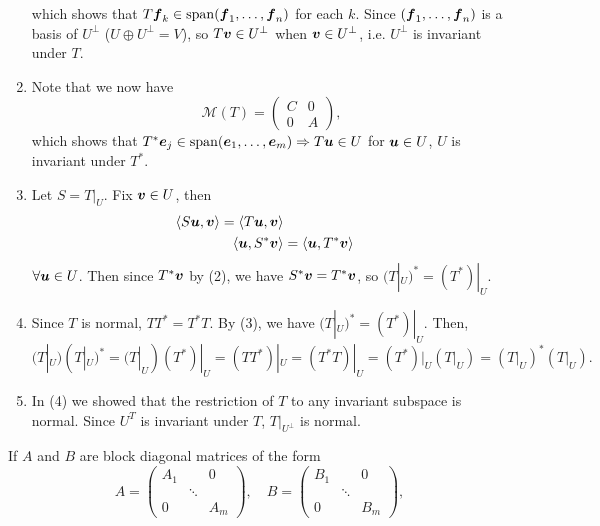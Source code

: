 \documentclass{report}
\DeclareMathOperator{\Span}{span}
\newcommand{\cM}{\mathcal{M}}
\begin{document}
\begin{myproof}
\begin{enumerate}
			which shows that $T\bmf_k\in\Span(\bmf_1,\ldots,\bmf_n)$ for each $k$. Since $(\boldsymbol{f}_1,\ldots,\boldsymbol{f}_n)$ is a basis of $U^{\perp}$ ($U\oplus U^{\perp}=V$), so $T\boldsymbol{v}\in U^{\perp}$ when $\boldsymbol{v}\in U^{\perp}$, i.e. $U^{\perp}$ is invariant under $T$.\\
			\item Note that we now have 
			$$\cM(T)=\begin{pmatrix}
				C & 0 \\ 0 & A
			\end{pmatrix},$$
			which shows that $T^*\bme_j\in\Span (\bme_1,\ldots,\bme_m)\Rightarrow T\bmu\in U$ for $\boldsymbol{u}\in U$, $U$ is invariant under $T^*$.\\
			\item Let $S=T|_U$. Fix $\boldsymbol{v}\in U$, then
			\begin{align*}
				\langle S\boldsymbol{u},\boldsymbol{v}\rangle=\langle T\boldsymbol{u},\boldsymbol{v}\rangle\\
				\langle \boldsymbol{u}, S^*\boldsymbol{v}\rangle&=\langle \boldsymbol{u},T^*\boldsymbol{v}\rangle
			\end{align*}
			$\forall \boldsymbol{u}\in U$. Then since $T^*\boldsymbol{v}$ by (2), we have $S^*\boldsymbol{v}=T^*\boldsymbol{v}$, so $(T|_U)^*=(T^*)|_U$.\\
			\item Since $T$ is normal, $TT^*=T^*T$. By (3), we have $(T|_U)^*=(T^*)|_U$. Then,
			$$(T|_U)(T|_U)^*=(T|_U)(T^*)|_U=(TT^*)|_U=(T^*T)|_U=(T^*)|_U(T|_U)=(T|_U)^*(T|_U).$$
			
			\item In (4) we showed that the restriction of $T$ to any invariant subspace is normal. Since $U^T$ is invariant under $T$, $T|_{U^{\perp}}$ is normal.
		\end{enumerate}
	\end{myproof}
	\vspace{2mm}
	If $A$ and $B$ are block diagonal matrices of the form
	$$A=\begin{pmatrix}
		A_1 &&0\\&\ddots&\\0&&A_m
	\end{pmatrix}, \quad B=\begin{pmatrix}
	B_1&&0\\&\ddots&\\0&&B_m
	\end{pmatrix},$$
\end{document}

